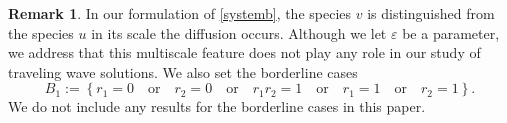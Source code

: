 \documentclass{amsart}
\theoremstyle{definition}
\newtheorem*{rmk}{Remark}
\numberwithin{equation}{section}
\begin{document}
\begin{rmk} \label{rmk1}
 In our formulation of \eqref{systemb}, the species $v$ is distinguished from the species $u$ in its scale the diffusion occurs. Although we let $\varepsilon$ be a parameter, we address that this multiscale feature does not play any role in our study of traveling wave solutions. We also set the borderline cases
$$B_1:= \left\{r_1=0 \quad \text{or} \quad r_2=0 \quad \text{or} \quad r_1r_2=1 \quad \text{or} \quad r_1=1 \quad\text{or} \quad r_2=1\right\}.$$
We do not include any results for the borderline cases in this paper. 
\end{rmk}





\end{document}
